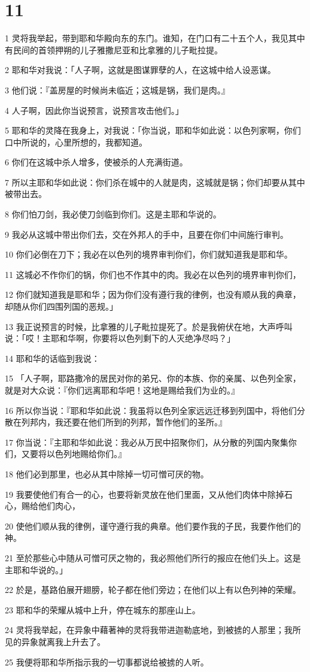 \chapter{11}

\par 1 灵将我举起，带到耶和华殿向东的东门。谁知，在门口有二十五个人，我见其中有民间的首领押朔的儿子雅撒尼亚和比拿雅的儿子毗拉提。
\par 2 耶和华对我说：「人子啊，这就是图谋罪孽的人，在这城中给人设恶谋。
\par 3 他们说：『盖房屋的时候尚未临近；这城是锅，我们是肉。』
\par 4 人子啊，因此你当说预言，说预言攻击他们。」
\par 5 耶和华的灵降在我身上，对我说：「你当说，耶和华如此说：以色列家啊，你们口中所说的，心里所想的，我都知道。
\par 6 你们在这城中杀人增多，使被杀的人充满街道。
\par 7 所以主耶和华如此说：你们杀在城中的人就是肉，这城就是锅；你们却要从其中被带出去。
\par 8 你们怕刀剑，我必使刀剑临到你们。这是主耶和华说的。
\par 9 我必从这城中带出你们去，交在外邦人的手中，且要在你们中间施行审判。
\par 10 你们必倒在刀下；我必在以色列的境界审判你们，你们就知道我是耶和华。
\par 11 这城必不作你们的锅，你们也不作其中的肉。我必在以色列的境界审判你们，
\par 12 你们就知道我是耶和华；因为你们没有遵行我的律例，也没有顺从我的典章，却随从你们四围列国的恶规。」
\par 13 我正说预言的时候，比拿雅的儿子毗拉提死了。於是我俯伏在地，大声呼叫说：「哎！主耶和华啊，你要将以色列剩下的人灭绝净尽吗？」
\par 14 耶和华的话临到我说：
\par 15 「人子啊，耶路撒冷的居民对你的弟兄、你的本族、你的亲属、以色列全家，就是对大众说：『你们远离耶和华吧！这地是赐给我们为业的。』
\par 16 所以你当说：『耶和华如此说：我虽将以色列全家远远迁移到列国中，将他们分散在列邦内，我还要在他们所到的列邦，暂作他们的圣所。』
\par 17 你当说：『主耶和华如此说：我必从万民中招聚你们，从分散的列国内聚集你们，又要将以色列地赐给你们。』
\par 18 他们必到那里，也必从其中除掉一切可憎可厌的物。
\par 19 我要使他们有合一的心，也要将新灵放在他们里面，又从他们肉体中除掉石心，赐给他们肉心，
\par 20 使他们顺从我的律例，谨守遵行我的典章。他们要作我的子民，我要作他们的神。
\par 21 至於那些心中随从可憎可厌之物的，我必照他们所行的报应在他们头上。这是主耶和华说的。」
\par 22 於是，基路伯展开翅膀，轮子都在他们旁边；在他们以上有以色列神的荣耀。
\par 23 耶和华的荣耀从城中上升，停在城东的那座山上。
\par 24 灵将我举起，在异象中藉著神的灵将我带进迦勒底地，到被掳的人那里；我所见的异象就离我上升去了。
\par 25 我便将耶和华所指示我的一切事都说给被掳的人听。

